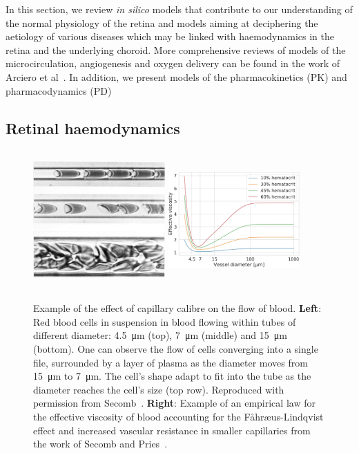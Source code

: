 \documentclass{article}
\begin{document}
In this section, we review \textit{in silico} models that contribute to our understanding of the normal physiology of the retina and models aiming at deciphering the aetiology of various diseases which may be linked with haemodynamics in the retina and the underlying choroid.
More comprehensive reviews of models of the microcirculation, angiogenesis and oxygen delivery can be found in the work of Arciero et al~\cite{Arciero_2017, Arciero_2019}.
In addition, we present models of the pharmacokinetics (PK) and pharmacodynamics (PD)


\subsection{Retinal haemodynamics}

\begin{figure}[t!]
  \centering
  \includegraphics[width=0.45\textwidth, height=5.3cm]{cropped-RBC-in-capillaries.jpg}
  \hfill
  \includegraphics[width=0.45\textwidth, height=5.3cm]{EffectiveViscosity-Secomb.jpeg}
  \caption{Example of the effect of capillary calibre on the flow of blood. \textbf{Left}: Red blood cells in suspension in blood flowing within tubes of different diameter: \SI{4.5}{\micro\meter} (top), \SI{7}{\micro\meter} (middle) and \SI{15}{\micro\meter} (bottom). One can observe the flow of cells converging into a single file, surrounded by a layer of plasma as the diameter moves from \SI{15}{\micro\meter} to \SI{7}{\micro\meter}. The cell's shape adapt to fit into the tube as the diameter reaches the cell's size (top row). Reproduced with permission from Secomb~\cite{Secomb_2003}. \textbf{Right}: Example of an empirical law for the effective viscosity of blood accounting for the F\r{a}hr\ae us-Lindqvist effect and increased vascular resistance in smaller capillaries from the work of Secomb and Pries~\cite{Secomb_2013}.}
  \label{fig:effectiveViscosity}
\end{figure}
\end{document}
